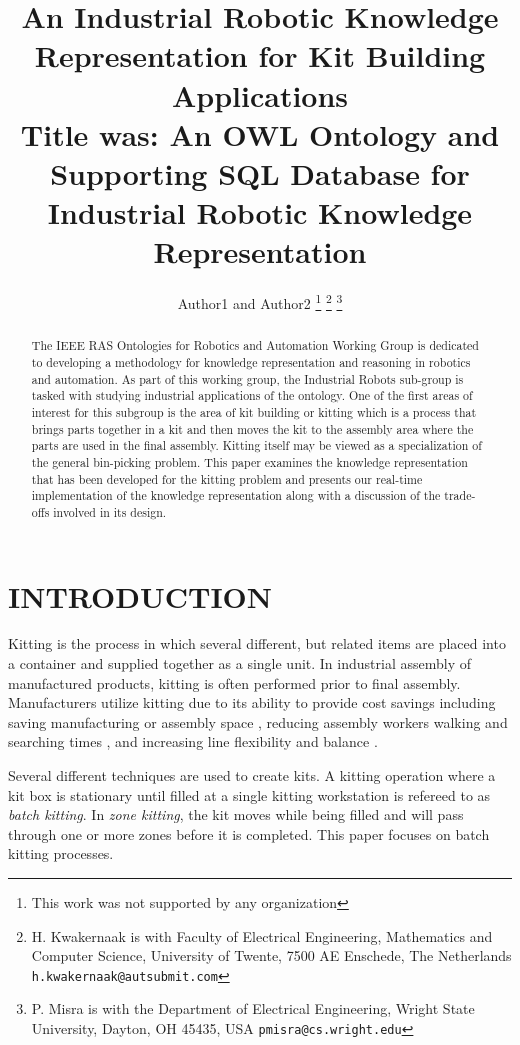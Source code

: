 \documentclass[a4paper, 10pt, conference]{ieeeconf}      %
\title{\LARGE \bf
An  Industrial Robotic Knowledge Representation for Kit Building Applications\\
Title was: An OWL Ontology and Supporting SQL Database for Industrial Robotic Knowledge Representation
}
\author{Author1 and Author2%
\thanks{This work was not supported by any organization}%
\thanks{H. Kwakernaak is with Faculty of Electrical Engineering, Mathematics and Computer Science,
        University of Twente, 7500 AE Enschede, The Netherlands
        {\tt\small h.kwakernaak@autsubmit.com}}%
\thanks{P. Misra is with the Department of Electrical Engineering, Wright State University,
        Dayton, OH 45435, USA
        {\tt\small pmisra@cs.wright.edu}}%
}
\begin{document}
\maketitle
\thispagestyle{empty}
\pagestyle{empty}


\begin{abstract}

The IEEE RAS Ontologies for Robotics and Automation Working Group is dedicated to developing a methodology for knowledge representation and reasoning in robotics and automation. As part of this working group, the Industrial Robots sub-group is tasked with studying industrial applications of the ontology. One of the first areas of interest for this subgroup is the area of kit building or kitting which is a process that brings parts together in a kit and then moves the kit to the assembly area where the parts are used in the final assembly. Kitting itself may be viewed as a specialization of the general bin-picking problem. This paper examines the knowledge representation that has been developed for the kitting problem and presents our real-time implementation of the knowledge representation along with a discussion of the trade-offs involved in its design.

\end{abstract}


\section{INTRODUCTION}
Kitting is the process in which several different, but related items are placed into a container and supplied together as a single unit.
In industrial assembly of manufactured products, kitting is often performed prior to final assembly. Manufacturers utilize kitting
due to its ability to provide cost savings \cite{Carlsson_2008} including saving manufacturing or assembly space \cite{Medbo2003}, reducing assembly workers walking and searching times \cite{Schwind1992}, and increasing line flexibility \cite{Bozer1992} and balance \cite{Jiao2000}.

Several different techniques are used to create kits. A kitting operation where a kit box is stationary until filled at a single
kitting workstation is refereed to as {\it batch kitting}. In {\it zone kitting}, the kit moves while being filled and will pass through one or
more zones before it is completed. This paper focuses on batch kitting processes.
\end{document}
